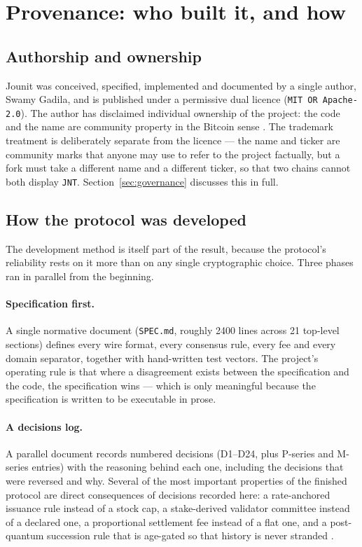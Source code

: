 \documentclass{article}
\begin{document}
\section{Provenance: who built it, and how}
\label{sec:provenance}

\subsection{Authorship and ownership}

Jounit was conceived, specified, implemented and documented by a single author,
Swamy Gadila, and is published under a permissive dual licence
(\texttt{MIT OR Apache-2.0}). The author has disclaimed individual ownership of
the project: the code and the name are community property in the Bitcoin sense
\cite{jounit-repo,jounit-readiness}. The trademark treatment is deliberately
separate from the licence --- the name and ticker are community marks that
anyone may use to refer to the project factually, but a fork must take a
different name and a different ticker, so that two chains cannot both display
\texttt{JNT}. Section~\ref{sec:governance} discusses this in full.

\subsection{How the protocol was developed}

The development method is itself part of the result, because the protocol's
reliability rests on it more than on any single cryptographic choice. Three
phases ran in parallel from the beginning.

\paragraph{Specification first.} A single normative document (\texttt{SPEC.md},
roughly 2400 lines across 21 top-level sections) defines every wire format,
every consensus rule, every fee and every domain separator, together with
hand-written test vectors. The project's operating rule is that where a
disagreement exists between the specification and the code, the specification
wins --- which is only meaningful because the specification is written to be
executable in prose.

\paragraph{A decisions log.} A parallel document records numbered decisions
(D1--D24, plus P-series and M-series entries) with the reasoning behind each
one, including the decisions that were reversed and why. Several of the most
important properties of the finished protocol are direct consequences of
decisions recorded here: a rate-anchored issuance rule instead of a stock cap,
a stake-derived validator committee instead of a declared one, a proportional
settlement fee instead of a flat one, and a post-quantum succession rule that
is age-gated so that history is never stranded \cite{jounit-decisions}.
\end{document}

